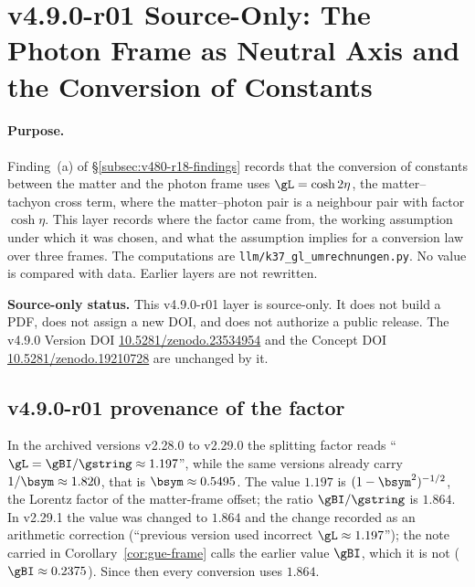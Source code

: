 \clearpage
\section*{v4.9.0-r01 Source-Only: The Photon Frame as Neutral Axis and the Conversion of Constants}
\label{sec:v490-r01-neutral-axis-conversion}

\paragraph{Purpose.}
Finding~(a) of \S\ref{subsec:v480-r18-findings} records that the conversion of constants between the matter and the
photon frame uses \(\gL=\cosh2\eta\), the matter--tachyon cross term, where the matter--photon pair is a neighbour pair
with factor \(\cosh\eta\).  This layer records where the factor came from, the working assumption under which it was
chosen, and what the assumption implies for a conversion law over three frames.  The computations are
\texttt{llm/k37\_gl\_umrechnungen.py}.  No value is compared with data.  Earlier layers are not rewritten.

\noindent\textbf{Source-only status.}
This v4.9.0-r01 layer is source-only.  It does not build a PDF, does not assign a new DOI,
and does not authorize a public release.  The v4.9.0 Version DOI
\href{https://doi.org/10.5281/zenodo.23534954}{10.5281/zenodo.23534954} and the Concept DOI
\href{https://doi.org/10.5281/zenodo.19210728}{10.5281/zenodo.19210728} are unchanged by it.

\subsection*{v4.9.0-r01 provenance of the factor}
\label{subsec:v490-r01-provenance}

In the archived versions v2.28.0 to v2.29.0 the splitting factor reads
``\(\gL=\gBI/\gstring\approx1.197\)'', while the same versions already carry \(1/\bsym\approx1.820\), that is
\(\bsym\approx0.5495\).  The value \(1.197\) is \((1-\bsym^2)^{-1/2}\), the Lorentz factor of the matter-frame
offset; the ratio \(\gBI/\gstring\) is \(1.864\).  In v2.29.1 the value was changed to \(1.864\) and the change recorded
as an arithmetic correction (``previous version used incorrect \(\gL\approx1.197\)''); the note carried in
Corollary~\ref{cor:gue-frame} calls the earlier value \(\gBI\), which it is not (\(\gBI\approx0.2375\)).  Since then
every conversion uses \(1.864\).

